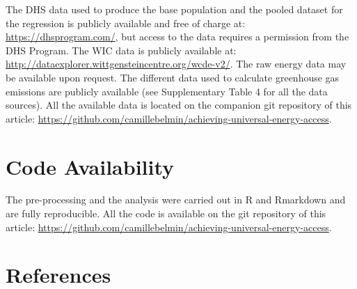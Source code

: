 \documentclass[
]{article}
\begin{document}
The DHS data used to produce the base population and the pooled dataset for the regression is publicly available and free of charge at: \url{https://dhsprogram.com/}, but access to the data requires a permission from the DHS Program. The WIC data is publicly available at: \url{http://dataexplorer.wittgensteincentre.org/wcde-v2/}. The raw energy data may be available upon request. The different data used to calculate greenhouse gas emissions are publicly available (see Supplementary Table 4 for all the data sources). All the available data is located on the companion git repository of this article: \url{https://github.com/camillebelmin/achieving-universal-energy-access}.

\hypertarget{code-availability}{%
\section*{Code Availability}\label{code-availability}}

The pre-processing and the analysis were carried out in R and Rmarkdown and are fully reproducible. All the code is available on the git repository of this article: \url{https://github.com/camillebelmin/achieving-universal-energy-access}.

\newpage

\hypertarget{references}{%
\section*{References}\label{references}}
\end{document}
